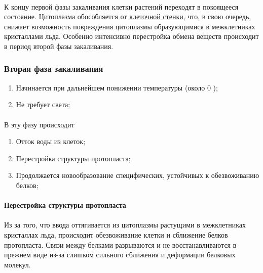 \paragraph*{}К концу первой фазы закаливания клетки растений переходят в покоящееся состояние. Цитоплазма обособляется от \hyperlink{cell_wall}{клеточной стенки}, что, в свою очередь, снижает возможность повреждения цитоплазмы образующимися в межклетниках кристаллами льда. Особенно интенсивно перестройка обмена веществ происходит в период второй фазы закаливания.

\subsubsection*{Вторая фаза закаливания}

\begin{enumerate}
	\item Начинается при дальнейшем понижении температуры (около 0 \celsius);
	\item Не требует света;
\end{enumerate} 
 
\paragraph*{}В эту фазу происходит 

\begin{enumerate}
	\item Отток воды из клеток;
	\item Перестройка структуры протопласта;
	\item Продолжается новообразование специфических, устойчивых к обезвоживанию белков;
\end{enumerate}

\paragraph*{Перестройка структуры протопласта}

\paragraph*{}Из за того, что ввода оттягивается из цитоплазмы растущими в межклетниках кристаллах льда, происходит обезвоживание клетки и сближение белков протопласта. Связи между белками разрываются и не восстанавливаются в прежнем виде из-за слишком сильного сближения и деформации белковых молекул. 

